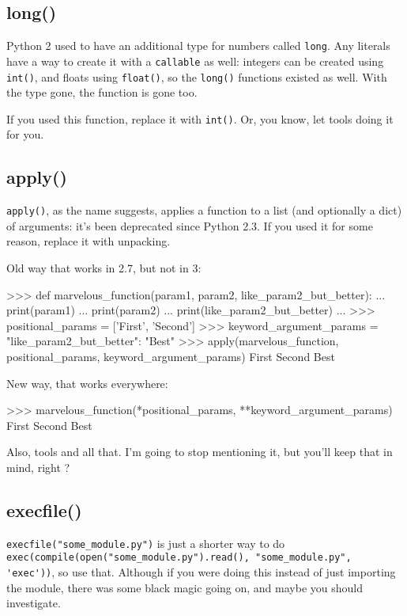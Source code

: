 \subsection{long()}

Python 2 used to have an additional type for numbers called \lstinline{long}. Any \glspl{literal} have a way to create it with a \lstinline{callable} as well: integers can be created using \lstinline{int()}, and floats using \lstinline{float()}, so the \lstinline{long()} functions existed as well. With the type gone, the function is gone too.

If you used this function, replace it with \lstinline{int()}. Or, you know, let tools doing it for you.

\subsection{apply()}

\lstinline{apply()}, as the name suggests, applies a function to a list (and optionally a dict) of arguments: it's been deprecated since Python 2.3. If you used it for some reason, replace it with unpacking.

Old way that works in 2.7, but not in 3:

\begin{py2}
>>> def marvelous_function(param1, param2, like_param2_but_better):
...    print(param1)
...    print(param2)
...    print(like_param2_but_better)
...
>>> positional_params = ['First', 'Second']
>>> keyword_argument_params = {"like_param2_but_better": "Best"}
>>> apply(marvelous_function, positional_params, keyword_argument_params)
First
Second
Best
\end{py2}

New way, that works everywhere:

\begin{py2and3}
>>> marvelous_function(*positional_params, **keyword_argument_params)
First
Second
Best
\end{py2and3}

Also, tools and all that. I'm going to stop mentioning it, but you'll keep that in mind, right ?

\subsection{execfile()}

\lstinline{execfile("some_module.py")} is just a shorter way to do \lstinline{exec(compile(open("some_module.py").read(), "some_module.py", 'exec'))}, so use that. Although if you were doing this instead of just importing the module, there was some black magic going on, and maybe you should investigate.


